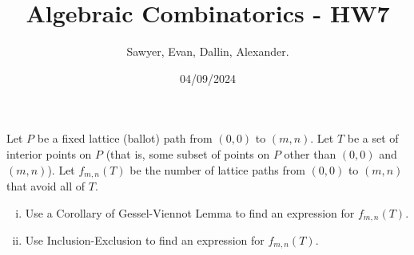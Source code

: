 \documentclass[letterpaper]{article}
\title{Algebraic Combinatorics - HW7}
\author{Sawyer, Evan, Dallin, Alexander.}
\date{04/09/2024}
\begin{document}
\maketitle
\begin{quest}[\textcolor{red}{Lattice Paths avoiding a certain set of points}]
Let $P$ be a fixed lattice (ballot) path from $(0,0)$ to $(m,n)$. Let $T$ be a set of interior points on $P$ (that is, some subset of points on $P$ other than $(0,0)$ and $(m,n)$). Let $f_{m,n}(T)$ be the number of lattice paths from $(0,0)$ to $(m,n)$ that avoid all of $T$.
\begin{enumerate}[(i)]
    \item Use a Corollary of Gessel-Viennot Lemma to find an expression for $f_{m,n}(T)$.
    \item Use Inclusion-Exclusion to find an expression for $f_{m,n}(T)$.
\end{enumerate}
\end{quest} 
\end{document}
